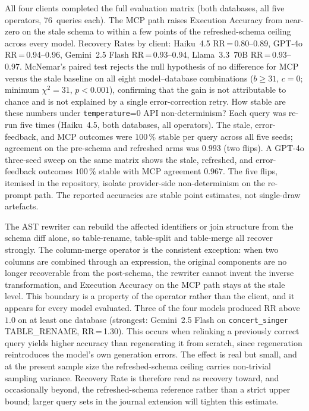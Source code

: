 \documentclass[conference,10pt,a4paper]{IEEEtran}
\begin{document}
All four clients completed the full evaluation matrix (both databases,
all five operators, 76~queries each). The MCP path raises Execution
Accuracy from near-zero on the stale schema to within a few points of
the refreshed-schema ceiling across every model. Recovery Rates by
client: Haiku~4.5 RR\,=\,0.80--0.89, GPT-4o RR\,=\,0.94--0.96,
Gemini~2.5 Flash RR\,=\,0.93--0.94, Llama~3.3~70B RR\,=\,0.93--0.97.
McNemar's paired test rejects the null hypothesis of no difference for
MCP versus the stale baseline on all eight model--database combinations
($b \geq 31$, $c = 0$; minimum $\chi^2 = 31$, $p < 0.001$), confirming
that the gain is not attributable to chance and is not explained by a
single error-correction retry.
How stable are these numbers under \texttt{temperature}=0 API
non-determinism? Each query was re-run five times (Haiku~4.5, both
databases, all operators). The stale, error-feedback, and MCP outcomes
were $100\,\%$ stable per query across all five seeds; agreement on
the pre-schema and refreshed arms was $0.993$ (two flips). A GPT-4o three-seed sweep on the same matrix shows the
stale, refreshed, and error-feedback outcomes $100\,\%$ stable with
MCP agreement $0.967$. The five flips, itemised in the repository,
isolate provider-side non-determinism on the re-prompt path. The
reported accuracies are stable point estimates, not single-draw
artefacts.

The AST rewriter can rebuild the affected identifiers or join
structure from the schema diff alone, so table-rename, table-split and
table-merge all recover strongly. The column-merge operator is the
consistent exception: when two columns are combined through an
expression, the original components are no longer recoverable from the
post-schema, the rewriter cannot invent the inverse transformation,
and Execution Accuracy on the MCP path stays at the stale level. This
boundary is a property of the operator rather than the client, and it
appears for every model evaluated. Three of the four models produced
RR above $1.0$ on at least one database (strongest: Gemini~2.5 Flash
on \texttt{concert\_singer} TABLE\_RENAME, RR\,=\,1.30). This occurs
when relinking a previously correct query yields higher accuracy than
regenerating it from scratch, since regeneration reintroduces the
model's own generation errors. The effect is real but small, and at
the present sample size the refreshed-schema ceiling carries
non-trivial sampling variance. Recovery Rate is therefore read as
recovery toward, and occasionally beyond, the refreshed-schema
reference rather than a strict upper bound; larger query sets in the
journal extension will tighten this estimate.
\end{document}
